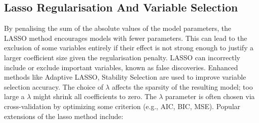 





\subsection{Lasso Regularisation And Variable Selection}
\noindent By penalising the sum of the absolute values of the model parameters, the LASSO method encourages models with fewer parameters. This can lead to the exclusion of some variables entirely if their effect is not strong enough to justify a larger coefficient size given the regularisation penalty. LASSO can incorrectly include or exclude important variables, known as false discoveries. Enhanced methods like Adaptive LASSO, Stability Selection are used to improve variable selection accuracy. The choice of \(\lambda\) affects the sparsity of the resulting model; too large a \(\lambda\) might shrink all coefficients to zero. The \(\lambda\) parameter is often chosen via cross-validation by optimizing some criterion (e.g., AIC, BIC, MSE). \parencite{freijeirogonzalez_critical_2022} Popular extensions of the lasso method include:

